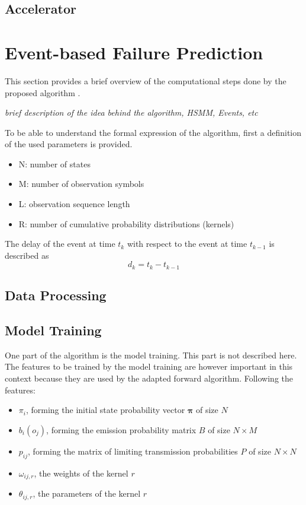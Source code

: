 \documentclass[mscthesis]{usiinfthesis}
\begin{document}
\section{Accelerator}

\chapter{Event-based Failure Prediction}

This section provides a brief overview of the computational steps done by the
proposed algorithm \cite{salfner08}.

\emph{\color{red}brief description of the idea behind the algorithm, HSMM, Events, etc}

To be able to understand the formal expression of the algorithm, first
a definition of the used parameters is provided.
\begin{itemize}
    \item N: number of states
    \item M: number of observation symbols
    \item L: observation sequence length
    \item R: number of cumulative probability distributions (kernels)
\end{itemize}
The delay of the event at time $ t_k $ with respect to the event at time
$ t_{k-1} $ is described as
\begin{equation}
    d_k = t_k-t_{k-1}
\end{equation}

\section{Data Processing}

\section{Model Training}

One part of the algorithm is the model training. This part is not described
here. The features to be trained by the model training are however important
in this context because they are used by the adapted forward algorithm.
Following the features:
\begin{itemize}
    \item $ \pi_i $, forming the initial state probability vector
        $ \boldsymbol{\pi} $ of size $ N $
    \item $ b_i(o_j) $, forming the emission probability matrix $ B $ of size
        $ N \times M $
    \item $ p_{ij} $, forming the matrix of limiting transmission probabilities
        $ P $ of size $ N \times N $
    \item $ \omega_{ij, r} $, the weights of the kernel $ r $
    \item $ \theta_{ij, r} $, the parameters of the kernel $ r $
\end{itemize}
\end{document}
